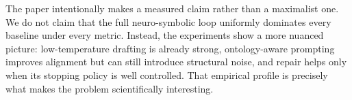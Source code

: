 The paper intentionally makes a measured claim rather than a maximalist one. We do not claim that the full neuro-symbolic loop uniformly dominates every baseline under every metric. Instead, the experiments show a more nuanced picture: low-temperature drafting is already strong, ontology-aware prompting improves alignment but can still introduce structural noise, and repair helps only when its stopping policy is well controlled. That empirical profile is precisely what makes the problem scientifically interesting.
